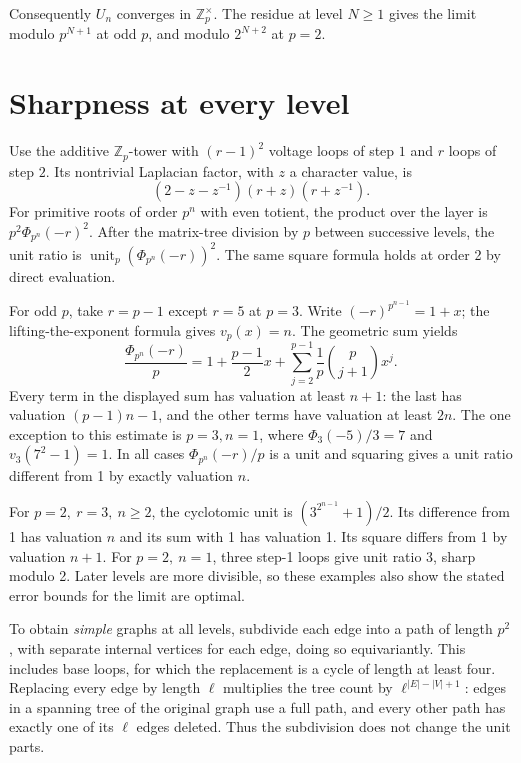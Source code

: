 \documentclass[11pt]{article}
\newcommand{\Z}{\mathbb Z}
\newcommand{\up}{\operatorname{unit}_p}
\begin{document}
Consequently \(U_n\) converges in \(\Z_p^\times\).
The residue at level \(N\ge1\) gives the limit modulo \(p^{N+1}\)
at odd \(p\), and modulo \(2^{N+2}\) at \(p=2\).
\newpage
\section{Sharpness at every level}
Use the additive \(\Z_p\)-tower with \((r-1)^2\) voltage loops of step
\(1\) and \(r\) loops of step \(2\). Its nontrivial Laplacian factor,
with \(z\) a character value, is
\[
 (2-z-z^{-1})(r+z)(r+z^{-1}).
\]
For primitive roots of order \(p^n\) with even totient, the product
over the layer is \(p^2\Phi_{p^n}(-r)^2\). After the matrix-tree
division by \(p\) between successive levels, the unit ratio is
\(\up(\Phi_{p^n}(-r))^2\). The same square formula holds at order
2 by direct evaluation.

For odd \(p\), take \(r=p-1\) except \(r=5\) at \(p=3\).
Write \((-r)^{p^{n-1}}=1+x\); the lifting-the-exponent formula gives
\(v_p(x)=n\). The geometric sum yields
\[
 \frac{\Phi_{p^n}(-r)}p
   =1+\frac{p-1}{2}x+
        \sum_{j=2}^{p-1}\frac1p\binom{p}{j+1}x^j .
\]
Every term in the displayed sum has valuation at least \(n+1\):
the last has valuation \((p-1)n-1\), and the other terms have
valuation at least \(2n\). The one exception to this estimate is
\(p=3,n=1\), where \(\Phi_3(-5)/3=7\) and \(v_3(7^2-1)=1\).
In all cases \(\Phi_{p^n}(-r)/p\) is a unit and squaring gives
a unit ratio different from 1 by exactly valuation \(n\).

For \(p=2,\ r=3,\ n\ge2\), the cyclotomic unit is
\((3^{2^{n-1}}+1)/2\). Its difference from 1 has valuation \(n\)
and its sum with 1 has valuation 1. Its square differs from 1
by valuation \(n+1\).
For \(p=2,\ n=1\), three step-1 loops give unit ratio 3, sharp
modulo 2. Later levels are more divisible, so these examples also
show the stated error bounds for the limit are optimal.

To obtain \emph{simple} graphs at all levels, subdivide each edge
into a path of length \(p^2\), with separate internal vertices for
each edge, doing so equivariantly. This includes base loops, for which
the replacement is a cycle of length at least four. Replacing every
edge by length \(\ell\) multiplies the tree count by
\(\ell^{|E|-|V|+1}\): edges in a spanning tree of the original graph
use a full path, and every other path has exactly one of its \(\ell\)
edges deleted. Thus the subdivision does not change the unit parts.
\end{document}
